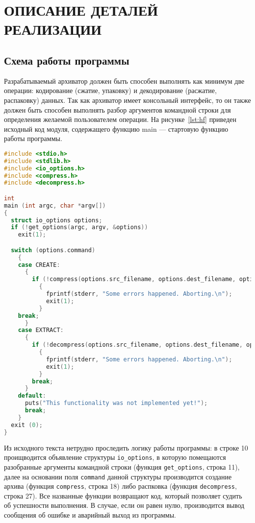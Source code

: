 \section[Описание деталей реализации]{ОПИСАНИЕ ДЕТАЛЕЙ РЕАЛИЗАЦИИ}
\label{sec:realization}

\subsection{Схема работы программы}

Разрабатываемый архиватор должен быть способен выполнять как минимум две
операции: кодирование (сжатие, упаковку) и декодирование (расжатие, распаковку)
данных.
Так как архиватор имеет консольный интерфейс, то он также должен быть способен
выполнять разбор аргументов командной строки для определения желаемой 
пользователем операции.
На рисунке~\ref{lst:hf} приведен исходный код модуля, содержащего функцию 
main --- стартовую функцию работы программы.

\begin{lstlisting}[basicstyle=\scriptsize\ttfamily,
                   numberstyle=\scriptsize\ttfamily,
                   xleftmargin=7mm,
                   language=C,caption=Исходный код функции main,
                   label=lst:hf]
#include <stdio.h>
#include <stdlib.h>
#include <io_options.h>
#include <compress.h>
#include <decompress.h>

int
main (int argc, char *argv[])
{
  struct io_options options;
  if (!get_options(argc, argv, &options))
    exit(1);

  switch (options.command)
    {
    case CREATE:
      {
        if (!compress(options.src_filename, options.dest_filename, options.verbose))
          {
            fprintf(stderr, "Some errors happened. Aborting.\n");
            exit(1);
          }
	break;
      }
    case EXTRACT:
      {
        if (!decompress(options.src_filename, options.dest_filename, options.verbose))
          {
            fprintf(stderr, "Some errors happened. Aborting.\n");
            exit(1);
          }
        break;
      }
    default:
      puts("This functionality was not implemented yet!");
      break;
    }
  exit (0);
}
\end{lstlisting}

Из исходного текста нетрудно проследить логику работы программы:
в строке 10 проищводится объявление структуры \texttt{io\_options},
в которую помещаются разобранные аргументы командной строки
(функция \texttt{get\_options}, строка 11),
далее на основании поля \texttt{command} данной структуры производится
создание архива (функция \texttt{compress}, строка 18)
либо распковка (функция \texttt{decompress}, строка 27).
Все названные функции возвращают код, 
который позволяет судить об успешности выполнения.
В случае, если он равен нулю, производится вывод сообщения об ошибке и 
аварийный выход из программы.

